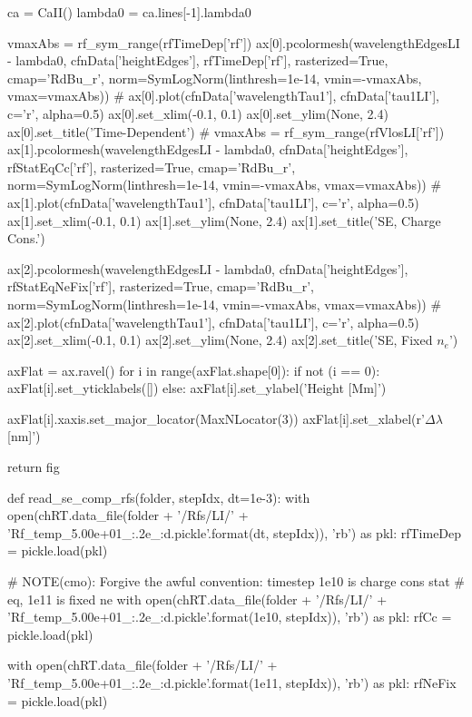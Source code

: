 \begin{pycode}[TimeDepRT]
    ca = CaII()
    lambda0 = ca.lines[-1].lambda0

    vmaxAbs = rf_sym_range(rfTimeDep['rf'])
    ax[0].pcolormesh(wavelengthEdgesLI - lambda0, cfnData['heightEdges'], rfTimeDep['rf'],
                        rasterized=True, cmap='RdBu_r',
                        norm=SymLogNorm(linthresh=1e-14, vmin=-vmaxAbs, vmax=vmaxAbs))
    # ax[0].plot(cfnData['wavelengthTau1'], cfnData['tau1LI'], c='r', alpha=0.5)
    ax[0].set_xlim(-0.1, 0.1)
    ax[0].set_ylim(None, 2.4)
    ax[0].set_title('Time-Dependent')
    # vmaxAbs = rf_sym_range(rfVlosLI['rf'])
    ax[1].pcolormesh(wavelengthEdgesLI - lambda0, cfnData['heightEdges'], rfStatEqCc['rf'],
                        rasterized=True, cmap='RdBu_r',
                        norm=SymLogNorm(linthresh=1e-14, vmin=-vmaxAbs, vmax=vmaxAbs))
    # ax[1].plot(cfnData['wavelengthTau1'], cfnData['tau1LI'], c='r', alpha=0.5)
    ax[1].set_xlim(-0.1, 0.1)
    ax[1].set_ylim(None, 2.4)
    ax[1].set_title('SE, Charge Cons.')

    ax[2].pcolormesh(wavelengthEdgesLI - lambda0, cfnData['heightEdges'], rfStatEqNeFix['rf'],
                        rasterized=True, cmap='RdBu_r',
                        norm=SymLogNorm(linthresh=1e-14, vmin=-vmaxAbs, vmax=vmaxAbs))
    # ax[2].plot(cfnData['wavelengthTau1'], cfnData['tau1LI'], c='r', alpha=0.5)
    ax[2].set_xlim(-0.1, 0.1)
    ax[2].set_ylim(None, 2.4)
    ax[2].set_title('SE, Fixed $n_e$')

    axFlat = ax.ravel()
    for i in range(axFlat.shape[0]):
        if not (i == 0):
            axFlat[i].set_yticklabels([])
        else:
            axFlat[i].set_ylabel('Height [Mm]')

        axFlat[i].xaxis.set_major_locator(MaxNLocator(3))
        axFlat[i].set_xlabel(r'$\Delta\lambda$ [nm]')

    return fig

def read_se_comp_rfs(folder, stepIdx, dt=1e-3):
    with open(chRT.data_file(folder + '/Rfs/LI/' + 'Rf_temp_5.00e+01_{:.2e}_{:d}.pickle'.format(dt, stepIdx)), 'rb') as pkl:
        rfTimeDep = pickle.load(pkl)

    # NOTE(cmo): Forgive the awful convention: timestep 1e10 is charge cons stat
    # eq, 1e11 is fixed ne
    with open(chRT.data_file(folder + '/Rfs/LI/' + 'Rf_temp_5.00e+01_{:.2e}_{:d}.pickle'.format(1e10, stepIdx)), 'rb') as pkl:
        rfCc = pickle.load(pkl)

    with open(chRT.data_file(folder + '/Rfs/LI/' + 'Rf_temp_5.00e+01_{:.2e}_{:d}.pickle'.format(1e11, stepIdx)), 'rb') as pkl:
        rfNeFix = pickle.load(pkl)


\end{pycode}
